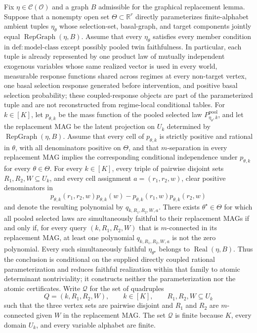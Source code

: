 Fix \(\eta\in\mathcal C(\mathcal O)\) and a graph \(B\) admissible for the graphical replacement lemma. Suppose that a nonempty open set \(\Theta\subset\mathbb R^r\) directly parameterizes finite-alphabet ambient tuples \(\eta_\theta\) whose selection-set, basal-graph, and target components jointly equal \(\operatorname{RepGraph}(\eta,B)\). Assume that every \(\eta_\theta\) satisfies every member condition in \(\mathrm{def:model\mbox{-}class}\) except possibly pooled twin faithfulness. In particular, each tuple is already represented by one product law of mutually independent exogenous variables whose same realized vector is used in every world, measurable response functions shared across regimes at every non-target vertex, one basal selection response generated before intervention, and positive basal selection probability; these coupled-response objects are part of the parameterized tuple and are not reconstructed from regime-local conditional tables. For \(k\in[K]\), let \(p_{\theta,k}\) be the mass function of the pooled selected law \(P_{\eta_\theta,k}^{\mathrm{pool}}\), and let the replacement MAG be the latent projection on \(U_k\) determined by \(\operatorname{RepGraph}(\eta,B)\). Assume that every cell of \(p_{\theta,k}\) is strictly positive and rational in \(\theta\), with all denominators positive on \(\Theta\), and that \(m\)-separation in every replacement MAG implies the corresponding conditional independence under \(p_{\theta,k}\) for every \(\theta\in\Theta\). For every \(k\in[K]\), every triple of pairwise disjoint sets \(R_1,R_2,W\subseteq U_k\), and every cell assignment \(a=(r_1,r_2,w)\), clear positive denominators in
\[
 p_{\theta,k}(r_1,r_2,w)p_{\theta,k}(w)
 -p_{\theta,k}(r_1,w)p_{\theta,k}(r_2,w)
\]
and denote the resulting polynomial by \(q_{k,R_1,R_2,W,a}\). There exists \(\theta^\star\in\Theta\) for which all pooled selected laws are simultaneously faithful to their replacement MAGs if and only if, for every query \((k,R_1,R_2,W)\) that is \(m\)-connected in its replacement MAG, at least one polynomial \(q_{k,R_1,R_2,W,a}\) is not the zero polynomial. Every such simultaneously faithful \(\eta_{\theta^\star}\) belongs to \(\operatorname{Real}(\eta,B)\). Thus the conclusion is conditional on the supplied directly coupled rational parameterization and reduces faithful realization within that family to atomic determinant nontriviality; it constructs neither the parameterization nor the atomic certificates.
Write \(\mathcal Q\) for the set of quadruples
\[
 Q=(k,R_1,R_2,W),
 \qquad k\in[K],\qquad
 R_1,R_2,W\subseteq U_k
\]
such that the three vertex sets are pairwise disjoint and \(R_1\) and \(R_2\) are \(m\)-connected given \(W\) in the replacement MAG. The set \(\mathcal Q\) is finite because \(K\), every domain \(U_k\), and every variable alphabet are finite.

